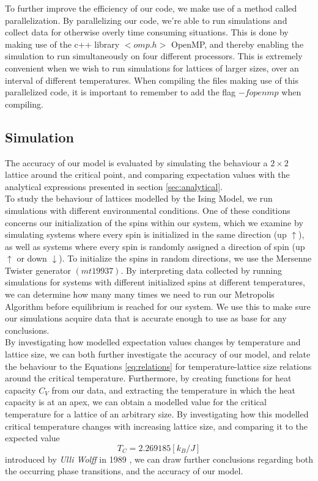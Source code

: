\documentclass[10pt, nofootinbib, twocolumn]{revtex4-1}
\begin{document}
To further improve the efficiency of our code, we make use of a method called parallelization. By parallelizing our code, we're able to run simulations and collect data for otherwise overly time consuming situations. This is done by making use of the c++ library $<omp.h>$ OpenMP, and thereby enabling the simulation to run simultaneously on four different processors. This is extremely convenient when we wish to run simulations for lattices of larger sizes, over an interval of different temperatures. When compiling the files making use of this parallelized code, it is important to remember to add the flag $-fopenmp$ when compiling. 


\subsection{Simulation}
The accuracy of our model is evaluated by simulating the behaviour a $2\times 2$ lattice around the critical point, and comparing expectation values with the analytical expressions presented in section \ref{sec:analytical}. \\

To study the behaviour of lattices modelled by the Ising Model, we run simulations with different environmental conditions. One of these conditions concerns our initialization of the spins within our system, which we examine by simulating systems where every spin is initialized in the same direction (up $\uparrow $), as well as systems where every spin is randomly assigned a direction of spin (up $\uparrow$ or down $\downarrow$). To initialize the spins in random directions, we use the Mersenne Twister generator $(mt19937)$. By interpreting data collected by running simulations for systems with different initialized spins at different temperatures, we can determine how many many times we need to run our Metropolis Algorithm before equilibrium is reached for our system. We use this to make sure our simulations acquire data that is accurate enough to use as base for any conclusions. \\ 

By investigating how modelled expectation values changes by temperature and lattice size, we can both further investigate the accuracy of our model, and relate the behaviour to the Equations \ref{eq:relations} for temperature-lattice size relations around the critical temperature. Furthermore, by creating functions for heat capacity $C_V$ from our data, and  extracting the temperature in which the heat capacity is at an apex, we can obtain a modelled value for the critical temperature for a lattice of an arbitrary size. By investigating how this modelled critical temperature changes with increasing lattice size, and comparing it to the expected value 
$$T_C=2.269185[k_B/J]$$
introduced by \textit{Ulli Wolff} in 1989 \cite[p.~448]{notes}, we can draw further conclusions regarding both the occurring phase transitions, and the accuracy of our model.
\end{document}
